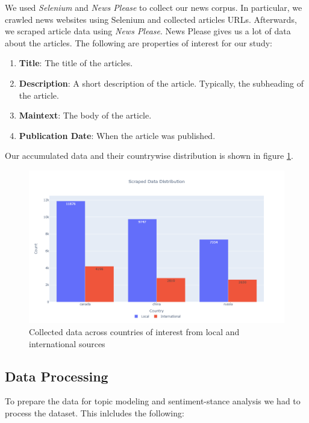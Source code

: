 \documentclass{article}
\theoremstyle{mytheoremstyle}
\theoremstyle{mytheoremstyle}
\theoremstyle{myproblemstyle}
\begin{document}
    We used \emph{Selenium} and \emph{News Please} to collect our news corpus. In particular, we crawled news websites using Selenium and collected articles URLs. Afterwards, we scraped article data using \emph{News Please}. News Please gives us a lot of data about the articles. \cite{Hamborg2017} The following are properties of interest for our study:

    \begin{enumerate}
        \item \textbf{Title}: The title of the articles.
        \item \textbf{Description}: A short description of the article. Typically, the subheading of the article.
        \item \textbf{Maintext}: The body of the article.
        \item \textbf{Publication Date}: When the article was published.
    \end{enumerate}

    Our accumulated data and their countrywise distribution is shown in figure \ref{fig:raw_data}.
    
    \begin{figure}[ht]
        \centering
        \includegraphics[width=0.75\linewidth]{../images/plots/barchart_scraped_data.png}
        \caption{Collected data across countries of interest from local and international sources}
        \label{fig:raw_data}
    \end{figure}

    \subsection{Data Processing}

    To prepare the data for topic modeling and sentiment-stance analysis we had to process the dataset. This inlcludes the following:
\end{document}
